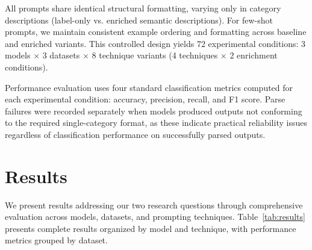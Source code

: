 \documentclass[sigconf,nonacm]{acmart}
\begin{document}
All prompts share identical structural formatting, varying only in category descriptions (label-only vs. enriched semantic descriptions). For few-shot prompts, we maintain consistent example ordering and formatting across baseline and enriched variants. This controlled design yields 72 experimental conditions: 3 models $\times$ 3 datasets $\times$ 8 technique variants (4 techniques $\times$ 2 enrichment conditions).

Performance evaluation uses four standard classification metrics computed for each experimental condition: accuracy, precision, recall, and F1 score. Parse failures were recorded separately when models produced outputs not conforming to the required single-category format, as these indicate practical reliability issues regardless of classification performance on successfully parsed outputs.

\section{Results}

We present results addressing our two research questions through comprehensive evaluation across models, datasets, and prompting techniques. Table~\ref{tab:results} presents complete results organized by model and technique, with performance metrics grouped by dataset.
\end{document}
